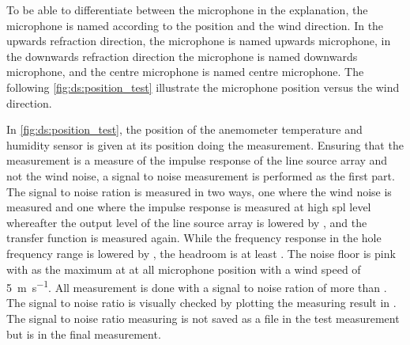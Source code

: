 To be able to differentiate between the microphone in the explanation, the microphone is named according to the position and the wind direction. In the upwards refraction direction, the microphone is named upwards microphone, in the downwards refraction direction the microphone is named downwards microphone, and the centre microphone is named centre microphone. The following \autoref{fig:ds:position_test} illustrate the microphone position versus the wind direction.


In \autoref{fig:ds:position_test}, the position of the anemometer temperature and humidity sensor is given at its position doing the measurement. Ensuring that the measurement is a measure of the impulse response of the line source array and not the wind noise, a signal to noise measurement is performed as the first part. The signal to noise ration is measured in two ways, one where the wind noise is measured and one where the impulse response is measured at high \gls{spl} level whereafter the output level of the line source array is lowered by , and the transfer function is measured again. While the frequency response in the hole frequency range is lowered by , the headroom is at least  . The noise floor is pink with  as the maximum at  at all microphone position with a wind speed of \SI{5}{\meter\per\second}. All measurement is done with a signal to noise ration of more than . The signal to noise ratio is visually checked by plotting the measuring result in \matlab. The signal to noise ratio measuring is not saved as a file in the test measurement but is in the final measurement.



